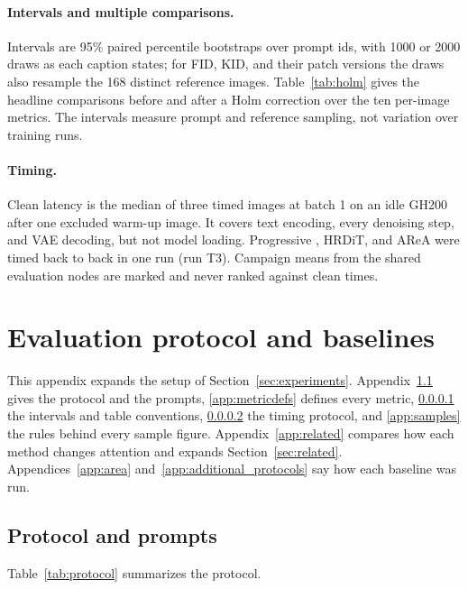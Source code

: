 \paragraph{Intervals and multiple comparisons.}\label{app:intervals} Intervals are 95\% paired percentile bootstraps over prompt ids, with 1000 or 2000 draws as each caption states; for FID, KID, and their patch versions the draws also resample the 168 distinct reference images. Table~\ref{tab:holm} gives the headline comparisons before and after a Holm correction over the ten per-image metrics. The intervals measure prompt and reference sampling, not variation over training runs.

\paragraph{Timing.}\label{app:timing} Clean latency is the median of three timed images at batch 1 on an idle GH200 after one excluded warm-up image. It covers text encoding, every denoising step, and VAE decoding, but not model loading. Progressive \sca{}, HRDiT, and AReA were timed back to back in one run (run T3). Campaign means from the shared evaluation nodes are marked and never ranked against clean times.


\else
\apxbarrier
\section{Evaluation protocol and baselines}
\label{app:metrics}

This appendix expands the setup of Section~\ref{sec:experiments}. Appendix~\ref{app:protocol} gives the protocol and the prompts, \ref{app:metricdefs} defines every metric, \ref{app:intervals} the intervals and table conventions, \ref{app:timing} the timing protocol, and \ref{app:samples} the rules behind every sample figure. Appendix~\ref{app:related} compares how each method changes attention and expands Section~\ref{sec:related}. Appendices~\ref{app:area} and~\ref{app:additional_protocols} say how each baseline was run.

\subsection{Protocol and prompts}
\label{app:protocol}

Table~\ref{tab:protocol} summarizes the protocol.

\apxprotocoltable

